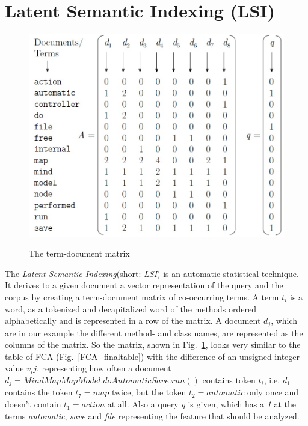 
\section{Latent Semantic Indexing (LSI)}
\label{ch:lsi}
\begin{figure}
  \centering
    \includegraphics[width=\linewidth]{src/pic/term_document_matrix}
    \label{term-document-matrix}
  \caption{The term-document matrix}
\end{figure}
The \emph{Latent Semantic Indexing}(short: \emph{LSI}) is an automatic statistical technique. It derives to a given document a vector representation of the query and the corpus by creating a term-document matrix of co-occurring terms. A term $t_i$ is a word, as a tokenized and decapitalized word of the methods ordered alphabetically and is represented in a row of the matrix. A document $d_j$, which are in our example the different method- and class names, are represented as the columns of the matrix. So the matrix, shown in Fig.~\ref{term-document-matrix}, looks very similar to the table of FCA (Fig.~\ref{FCA_finaltable}) with the difference of an unsigned integer value $v_ij$, representing how often a document $d_j=MindMapMapModel.doAutomaticSave.run()$ contains token $t_i$, i.e. $d_1$ contains the token $t_7=map$ twice, but the token $t_2=automatic$ only once and doesn't contain $t_1=action$ at all. Also a query \emph{q} is given, which has a \emph{1} at the terms \emph{automatic}, \emph{save} and \emph{file} representing the feature that should be analyzed. 


